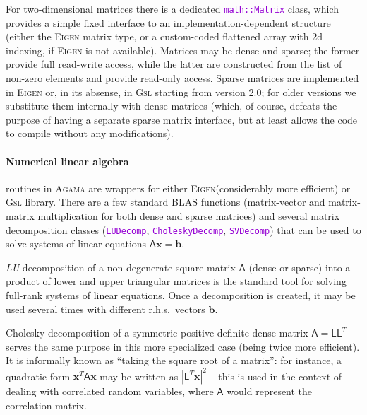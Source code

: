 \documentclass[12pt]{article}
\newcommand{\Agama}{\textsc{Agama}\xspace}
\newcommand{\Gsl}  {\textsc{Gsl}\xspace}
\newcommand{\Eigen}{\textsc{Eigen}\xspace}
\newcommand{\ttt}[1]{\textcolor{darkviolet}{\texttt{#1}}}
\newcommand{\bx}{\boldsymbol{x}}
\begin{document}
For two-dimensional matrices there is a dedicated \ttt{math::Matrix} class, which provides a simple fixed interface to an implementation-dependent structure (either the \Eigen matrix type, or a custom-coded flattened array with 2d indexing, if \Eigen is not available).
Matrices may be dense and sparse; the former provide full read-write access, while the latter are constructed from the list of non-zero elements and provide read-only access. Sparse matrices are implemented in \Eigen or, in its absense, in \Gsl starting from version 2.0; for older versions we substitute them internally with dense matrices (which, of course, defeats the purpose of having a separate sparse matrix interface, but at least allows the code to compile without any modifications).

\paragraph{Numerical linear algebra}  routines in \Agama are wrappers for either \Eigen (considerably more efficient) or \Gsl library.
There are a few standard BLAS functions (matrix-vector and matrix-matrix multiplication for both dense and sparse matrices) and several matrix decomposition classes (\ttt{LUDecomp}, \ttt{CholeskyDecomp}, \ttt{SVDecomp}) that can be used to solve systems of linear equations $\mathsf{A}\bx=\boldsymbol{b}$.

\textsl{LU} decomposition of a non-degenerate square matrix $\mathsf{A}$ (dense or sparse) into a product of lower and upper triangular matrices is the standard tool for solving full-rank systems of linear equations. Once a decomposition is created, it may be used several times with different r.h.s.\ vectors $\boldsymbol{b}$.

Cholesky decomposition of a symmetric positive-definite dense matrix $\mathsf{A} = \mathsf{L}\mathsf{L}^T$ serves the same purpose in this more specialized case (being twice more efficient). It is informally known as ``taking the square root of a matrix'': for instance, a quadratic form $\bx^T \mathsf{A} \bx$ may be written as $|\mathsf{L}^T\bx|^2$ -- this is used in the context of dealing with correlated random variables, where $\mathsf{A}$ would represent the correlation matrix.
\end{document}

